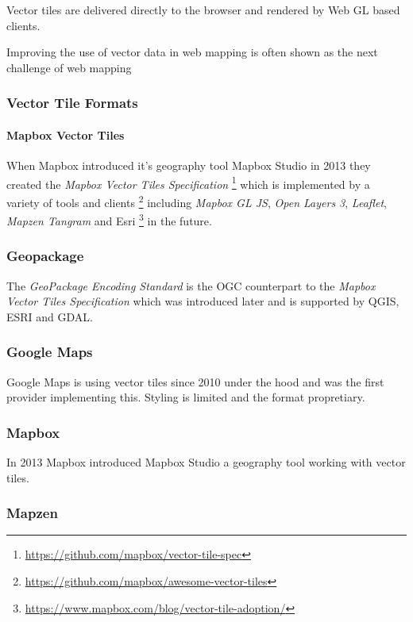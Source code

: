 Vector tiles are delivered directly to the browser and rendered by Web
GL based clients.


Improving the use of vector data in web mapping is often shown as the next challenge
of web mapping \cite[p.~88]{gaffuri2012toward} 

\subsubsection{Vector Tile Formats}

\paragraph{Mapbox Vector Tiles}

When Mapbox introduced it's geography tool Mapbox Studio in 2013 they
created the \emph{Mapbox Vector Tiles Specification}
\footnote{\url{https://github.com/mapbox/vector-tile-spec}} which is
implemented by a variety of tools and clients
\footnote{\url{https://github.com/mapbox/awesome-vector-tiles}}
including \emph{Mapbox GL JS}, \emph{Open Layers 3}, \emph{Leaflet},
\emph{Mapzen Tangram} and Esri
\footnote{\url{https://www.mapbox.com/blog/vector-tile-adoption/}} in
the future.

\subsubsection{Geopackage}

The \emph{GeoPackage Encoding Standard} is the OGC counterpart to the
\emph{Mapbox Vector Tiles Specification} which was introduced later and
is supported by QGIS, ESRI and GDAL.

\subsubsection{Google Maps}

Google Maps is using vector tiles since 2010 under the hood and was the
first provider implementing this. Styling is limited and the format
propretiary.

\subsubsection{Mapbox}

In 2013 Mapbox introduced Mapbox Studio a geography tool working with
vector tiles.

\subsubsection{Mapzen}

